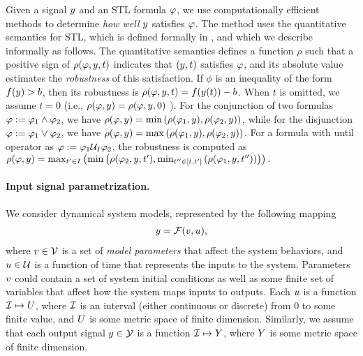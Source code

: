 Given a signal $y$ and an STL formula $\varphi$, we use computationally efficient methods to determine \emph{how well} $y$ satisfies $\varphi$.
The method uses the quantitative semantics for STL, which 
is defined formally in \cite{DonzeM10}, and which we describe informally as follows. The
quantitative semantics defines a function $\rho$ such that a positive sign of
$\rho(\varphi,y,t)$ indicates that $(y,t)$ satisfies
$\varphi$, and its absolute value estimates the \emph{robustness} of
this satisfaction. If $\phi$ is an inequality of the form
$f(y)>b$, then its robustness is $\rho(\varphi,y,t) = f(y(t))-b$.  
When $t$ is omitted, we assume $t=0$ (i.e., $\rho(\varphi,y)=\rho(\varphi,y,0)$ ).
For the conjunction of two
formulas $\varphi := \varphi_1 \wedge \varphi_2$, we have
$\rho(\varphi,y)=\min \left( \rho(\varphi_1,y),\rho(\varphi_2,y)\right)$,
while for the disjunction $\varphi := \varphi_1 \vee \varphi_2$, we have
$\rho(\varphi,y)=\max\left(\rho(\varphi_1,y),\rho(\varphi_2,y)\right)$.
For a formula with until operator as $\varphi := \varphi_1 \mathcal{U}_I \varphi_2$,
the robustness is computed as $\rho(\varphi,y) = \max_{t^\prime\in
  I}\left(\min\left(\rho(\varphi_2,y,t^\prime),\min_{t^{\prime\prime}\in
  [t,t^\prime]}\left(\rho(\varphi_1,y,t^{\prime\prime})\right)\right)\right).$


\paragraph{Input signal parametrization.} We consider dynamical system models, represented by the following mapping
\begin{eqnarray}
y = \mathcal{F} (v, u),
\end{eqnarray}
where $v \in \mathcal{V}$ is a set of {\em model parameters} that affect the system behaviors, and $u \in \mathcal{U}$ is a function of time that represents the inputs to the system.
Parameters $v$ could contain a set of system initial conditions as well as some finite set of variables that affect how the system maps inputs to outputs.
Each $u$ is a function $\mathcal{I} \mapsto U$, where $\mathcal{I}$ is an interval (either continuous or discrete) from $0$ to some finite value, and $U$ is some metric space of finite dimension.
Similarly, we assume that each output signal $y \in \mathcal{Y}$ is a function $\mathcal{I} \mapsto Y$, where $Y$ is some metric space of finite dimension.

